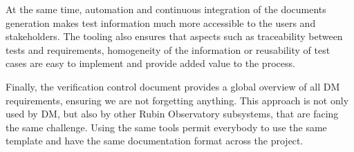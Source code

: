At the same time, automation and continuous integration of the documents generation makes test information
much more accessible to the users and stakeholders.
The tooling also ensures that aspects such as traceability between tests and requirements, homogeneity of the information
or reusability of test cases are easy to implement and provide added value to the process.

Finally, the verification control document provides a global overview of all DM requirements, ensuring we are not forgetting anything.
This approach is not only used by DM, but also by other Rubin Observatory subsystems, that are facing the same challenge.
Using the same tools permit everybody to use the same template and have the same documentation format across the project.



